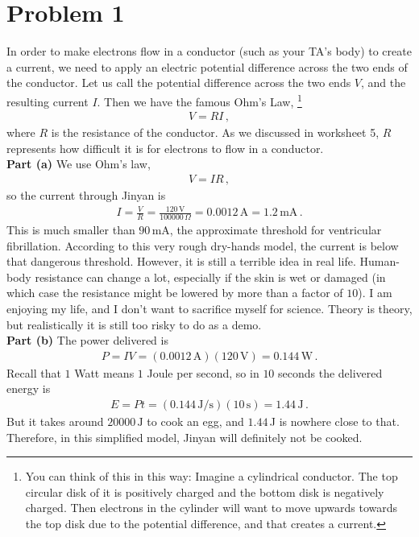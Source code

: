 \documentclass[11pt]{article}
\begin{document}
\section*{Problem 1}
In order to make electrons flow in a conductor (such as your TA's body) to create a current, we need to apply an electric potential difference across the two ends of the conductor. Let us call the potential difference across the two ends $V$, and the resulting current $I$. Then we have the famous Ohm's Law, \footnote{You can think of this in this way: Imagine a cylindrical conductor. The top circular disk of it is positively charged and the bottom disk is negatively charged. Then electrons in the cylinder will want to move upwards towards the top disk due to the potential difference, and that creates a current.}
\begin{align*}
V=RI\,,
\end{align*}
where $R$ is the resistance of the conductor. As we discussed in worksheet 5, $R$ represents how difficult it is for electrons to flow in a conductor.\\

\noindent\textbf{Part (a)} We use Ohm's law,
\begin{align*}
V = IR\,,
\end{align*}
so the current through Jinyan is
\begin{align*}
I = \frac{V}{R} = \frac{120\,\text{V}}{100000\,\Omega} = 0.0012\,\text{A} = 1.2\,\text{mA}\,.
\end{align*}
This is much smaller than $90$\,mA, the approximate threshold for ventricular fibrillation. According to this very rough dry-hands model, the current is below that dangerous threshold. However, it is still a terrible idea in real life. Human-body resistance can change a lot, especially if the skin is wet or damaged (in which case the resistance might be lowered by more than a factor of $10$). I am enjoying my life, and I don't want to sacrifice myself for science. Theory is theory, but realistically it is still too risky to do as a demo.\\

\noindent\textbf{Part (b)} The power delivered is
\begin{align*}
P = IV = (0.0012\,\text{A})(120\,\text{V}) = 0.144\,\text{W}\,.
\end{align*}
Recall that $1$ Watt means $1$ Joule per second, so in $10$ seconds the delivered energy is
\begin{align*}
E = Pt = (0.144\,\text{J/s})(10\,\text{s}) = 1.44\,\text{J}\,.
\end{align*}
But it takes around
$20000\,\text{J}$
to cook an egg, and $1.44$\,J is nowhere close to that. Therefore, in this simplified model, Jinyan will definitely not be cooked.\\
\end{document}
